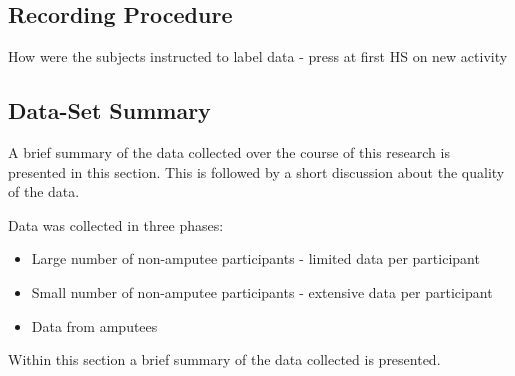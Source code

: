 \subsection{Recording Procedure}
How were the subjects instructed to label data - press at first HS on new activity


\subsection{Data-Set Summary} %
A brief summary of the data collected over the course of this research is presented in this section. This is followed by a short discussion about the quality of the data.

Data was collected in three phases:
\begin{itemize}
    \item Large number of non-amputee participants - limited data per participant
    \item Small number of non-amputee participants - extensive data per participant
    \item Data from amputees
\end{itemize}
Within this section a brief summary of the data collected is presented.


